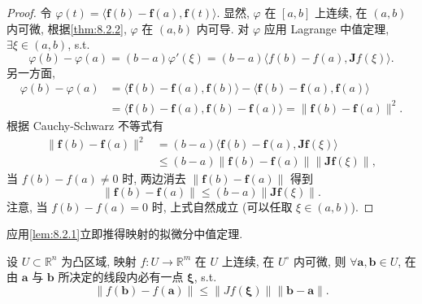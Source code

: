 \begin{proof}
令 $\varphi(t) = \langle\boldsymbol{f}(b) - \boldsymbol{f}(a), \boldsymbol{f}(t)\rangle$. 显然, $\varphi$ 在 $[a, b]$ 上连续, 在 $(a, b)$ 内可微, 根据\cref{thm:8.2.2}, $\varphi$ 在 $(a, b)$ 内可导. 对 $\varphi$ 应用 Lagrange 中值定理, $\exists\xi \in (a, b)$, s.t.
\[
  \varphi(b) - \varphi(a) = (b - a)\varphi'(\xi) = (b - a)\langle f(b) - f(a), \boldsymbol{J}f(\xi)\rangle.
\]
另一方面,
\begin{align*}
  \varphi(b) - \varphi(a) &= \langle\boldsymbol{f}(b) - \boldsymbol{f}(a), \boldsymbol{f}(b)\rangle - \langle\boldsymbol{f}(b) - \boldsymbol{f}(a), \boldsymbol{f}(a)\rangle \\
  &= \langle\boldsymbol{f}(b) - \boldsymbol{f}(a), \boldsymbol{f}(b) - \boldsymbol{f}(a)\rangle = \|\boldsymbol{f}(b) - \boldsymbol{f}(a)\|^{2}.
\end{align*}
根据 Cauchy-Schwarz 不等式有
\begin{align*}
  \|\boldsymbol{f}(b) - \boldsymbol{f}(a)\|^{2} &= (b - a)\langle\boldsymbol{f}(b) - \boldsymbol{f}(a), \boldsymbol{J}\boldsymbol{f}(\xi)\rangle \\
  &\leqslant (b - a)\|\boldsymbol{f}(b) - \boldsymbol{f}(a)\|\|\boldsymbol{J}\boldsymbol{f}(\xi)\|,
\end{align*}
当 $f(b) - f(a) \neq 0$ 时, 两边消去 $\|\boldsymbol{f}(b) - \boldsymbol{f}(a)\|$ 得到
\[
  \|\boldsymbol{f}(b) - \boldsymbol{f}(a)\| \leqslant (b - a)\|\boldsymbol{J}\boldsymbol{f}(\xi)\|.
\]
注意, 当 $f(b) - f(a) = 0$ 时, 上式自然成立 (可以任取 $\xi \in (a, b)$).
\end{proof}

应用\cref{lem:8.2.1}立即推得映射的拟微分中值定理.

\begin{theorem}[映射的拟微分中值定理]\label{thm:8.2.9}
设 $U \subset \mathbb{R}^{n}$ 为凸区域, 映射 $f: U \to \mathbb{R}^{m}$ 在 $U$ 上连续, 在 $U^{\circ}$ 内可微, 则 $\forall \boldsymbol{a}, \boldsymbol{b} \in U$, 在由 $\boldsymbol{a}$ 与 $\boldsymbol{b}$ 所决定的线段内必有一点 $\boldsymbol{\xi}$, s.t.
\[
  \|f(\boldsymbol{b}) - f(\boldsymbol{a})\| \leqslant \|Jf(\boldsymbol{\xi})\|\|\boldsymbol{b} - \boldsymbol{a}\|.
\]
\end{theorem}

